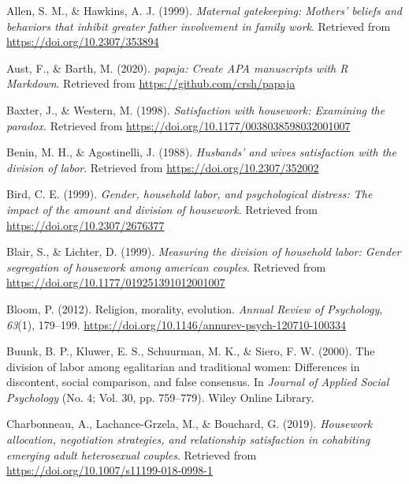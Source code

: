 \documentclass[
  man,floatsintext]{apa6}
\newlength{\cslhangindent}
\newlength{\cslentryspacingunit} %
\newenvironment{CSLReferences}[2] %
 {%
  \setlength{\parindent}{0pt}
  \ifodd #1
  \let\oldpar\par
  \def\par{\hangindent=\cslhangindent\oldpar}
  \fi
  \setlength{\parskip}{#2\cslentryspacingunit}
 }%
 {}
\begin{document}
\hypertarget{refs}{}
\begin{CSLReferences}{1}{0}
\leavevmode{}%
Allen, S. M., \& Hawkins, A. J. (1999). \emph{Maternal gatekeeping: Mothers' beliefs and behaviors that inhibit greater father involvement in family work}. Retrieved from \url{https://doi.org/10.2307/353894}

\leavevmode{}%
Aust, F., \& Barth, M. (2020). \emph{{papaja}: {Create} {APA} manuscripts with {R Markdown}}. Retrieved from \url{https://github.com/crsh/papaja}

\leavevmode{}%
Baxter, J., \& Western, M. (1998). \emph{Satisfaction with housework: Examining the paradox.} Retrieved from \url{https://doi.org/10.1177/0038038598032001007}

\leavevmode{}%
Benin, M. H., \& Agostinelli, J. (1988). \emph{Husbands' and wives satisfaction with the division of labor}. Retrieved from \url{https://doi.org/10.2307/352002}

\leavevmode{}%
Bird, C. E. (1999). \emph{Gender, household labor, and psychological distress: The impact of the amount and division of housework}. Retrieved from \url{https://doi.org/10.2307/2676377}

\leavevmode{}%
Blair, S., \& Lichter, D. (1999). \emph{Measuring the division of household labor: Gender segregation of housework among american couples}. Retrieved from \url{https://doi.org/10.1177/019251391012001007}

\leavevmode{}%
Bloom, P. (2012). Religion, morality, evolution. \emph{Annual Review of Psychology}, \emph{63}(1), 179--199. \url{https://doi.org/10.1146/annurev-psych-120710-100334}

\leavevmode{}%
Buunk, B. P., Kluwer, E. S., Schuurman, M. K., \& Siero, F. W. (2000). The division of labor among egalitarian and traditional women: Differences in discontent, social comparison, and false consensus. In \emph{Journal of Applied Social Psychology} (No. 4; Vol. 30, pp. 759--779). Wiley Online Library.

\leavevmode{}%
Charbonneau, A., Lachance-Grzela, M., \& Bouchard, G. (2019). \emph{Housework allocation, negotiation strategies, and relationship satisfaction in cohabiting emerging adult heterosexual couples}. Retrieved from \url{https://doi.org/10.1007/s11199-018-0998-1}


\end{CSLReferences}
\end{document}
